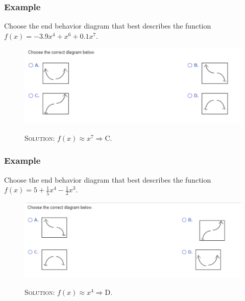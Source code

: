 \documentclass{beamer}
\begin{document}
\begin{frame}
	\frametitle{Example}
	\begin{enumerate}
		\item[]<1-> Choose the end behavior diagram that best describes the function $f(x)=-3.9x^{4}+x^{6}+0.1x^{7}$.
		\item[]<2->
    \begin{figure}
      \begin{center}
        \caption{}
        \includegraphics[scale=0.35]{4_1_5.png}
      \end{center}
      \item[]<3-> \textsc{Solution:} $f(x) \approx x^{7} \Rightarrow $C.
    \end{figure}
	\end{enumerate}
\end{frame}

\begin{frame}
	\frametitle{Example}
	\begin{enumerate}
		\item[]<1-> Choose the end behavior diagram that best describes the function $f(x)=5+\frac{1}{5}x^{4}-\frac{1}{2}x^{3}$.
		\item[]<2->
    \begin{figure}
      \begin{center}
        \caption{}
        \includegraphics[scale=0.35]{4_1_6.png}
      \end{center}
      \item[]<3-> \textsc{Solution:} $f(x) \approx x^{4} \Rightarrow $D.
    \end{figure}
	\end{enumerate}
\end{frame}
\end{document}
